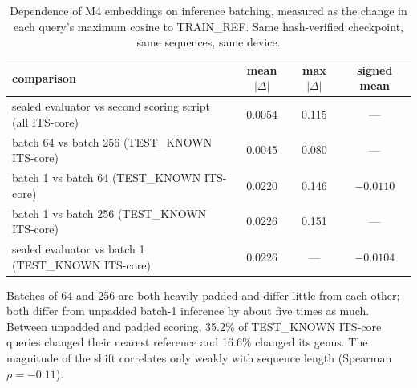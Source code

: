 \begin{table}[htbp]\centering
\begin{threeparttable}
\caption{Dependence of M4 embeddings on inference batching, measured as the change in each query's maximum cosine to TRAIN\_REF. Same hash-verified checkpoint, same sequences, same device.}
\label{tab:padding}
\small
\begin{tabular}{lccc}
\toprule
comparison & mean $|\Delta|$ & max $|\Delta|$ & signed mean \\
\midrule
sealed evaluator vs second scoring script (all ITS-core) & 0.0054 & 0.115 & --- \\
batch 64 vs batch 256 (TEST\_KNOWN ITS-core) & 0.0045 & 0.080 & --- \\
batch 1 vs batch 64 (TEST\_KNOWN ITS-core) & 0.0220 & 0.146 & $-0.0110$ \\
batch 1 vs batch 256 (TEST\_KNOWN ITS-core) & 0.0226 & 0.151 & --- \\
sealed evaluator vs batch 1 (TEST\_KNOWN ITS-core) & 0.0226 & --- & $-0.0104$ \\
\bottomrule
\end{tabular}
\begin{tablenotes}\footnotesize
\item Batches of 64 and 256 are both heavily padded and differ little from each other; both differ from unpadded batch-1 inference by about five times as much. Between unpadded and padded scoring, 35.2\% of TEST\_KNOWN ITS-core queries changed their nearest reference and 16.6\% changed its genus. The magnitude of the shift correlates only weakly with sequence length (Spearman $\rho=-0.11$).
\end{tablenotes}
\end{threeparttable}
\end{table}
